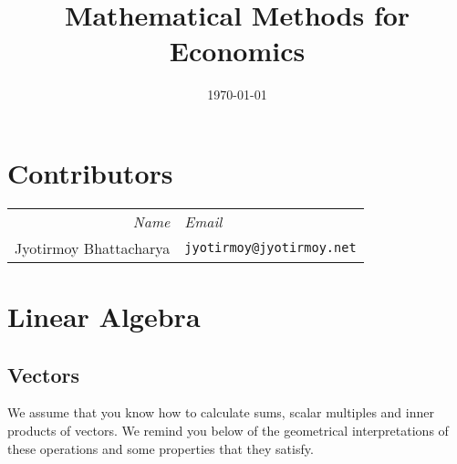 \documentclass[11pt,reqno,openany]{amsbook}
\title{Mathematical Methods for Economics}
\date{\today}
\numberwithin{figure}{chapter}
\numberwithin{equation}{chapter}
\theoremstyle{plain}
\theoremstyle{definition}
\begin{document}
\frontmatter
\maketitle
\tableofcontents
\chapter*{Contributors}
\begin{tabular}{rl}
  \textit{Name} & \textit{Email}\\
  Jyotirmoy Bhattacharya & \texttt{jyotirmoy@jyotirmoy.net}\\
\end{tabular}
\mainmatter
\chapter{Linear Algebra}
\section{Vectors}
We assume that you know how to calculate sums, scalar multiples and
inner products of vectors. We remind you below of the geometrical
interpretations of these operations and some properties that they
satisfy.
\end{document}
